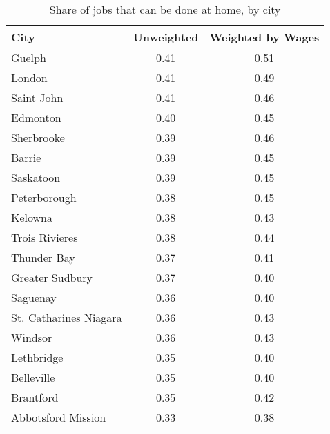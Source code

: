 \begin{table}[ht]
\centering
\caption{Share of jobs that can be done at home, by city} 
\label{tab:provinces}
\begingroup\scriptsize
\begin{tabular}{lcc}
  \hline
City & Unweighted & Weighted by Wages \\ 
  \hline
Guelph & 0.41 & 0.51 \\ 
  London & 0.41 & 0.49 \\ 
  Saint John & 0.41 & 0.46 \\ 
  Edmonton & 0.40 & 0.45 \\ 
  Sherbrooke & 0.39 & 0.46 \\ 
  Barrie & 0.39 & 0.45 \\ 
  Saskatoon & 0.39 & 0.45 \\ 
  Peterborough & 0.38 & 0.45 \\ 
  Kelowna & 0.38 & 0.43 \\ 
  Trois Rivieres & 0.38 & 0.44 \\ 
  Thunder Bay & 0.37 & 0.41 \\ 
  Greater Sudbury & 0.37 & 0.40 \\ 
  Saguenay & 0.36 & 0.40 \\ 
  St. Catharines   Niagara & 0.36 & 0.43 \\ 
  Windsor & 0.36 & 0.43 \\ 
  Lethbridge & 0.35 & 0.40 \\ 
  Belleville & 0.35 & 0.40 \\ 
  Brantford & 0.35 & 0.42 \\ 
  Abbotsford   Mission & 0.33 & 0.38 \\ 
   \hline
\end{tabular}
\endgroup
\end{table}
